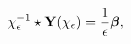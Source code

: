 \begin{equation}
\chi_{\epsilon}^{-1}\star {\bf  Y}(\chi_{\epsilon})=\frac{1}{\epsilon}\boldsymbol\beta,\label{zz.1}
\end{equation}

